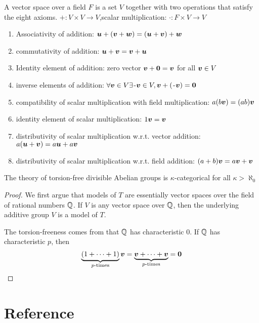 \documentclass[11pt]{article}
\begin{document}
\begin{definition}[]
A vector space over a field \(F\) is a set \(V\) together with two operations
that satisfy the eight axioms. \(+:V\times V\to V\),scalar multiplication:
\(\cdot:F\times V\to V\) 
\begin{enumerate}
\item Associativity of addition: \(\boldsymbol{u}+(\boldsymbol{v}+\boldsymbol{w})=(\boldsymbol{u}+\boldsymbol{v})+\boldsymbol{w}\)
\item commutativity of addition: \(\boldsymbol{u}+\boldsymbol{v}=\boldsymbol{v}+\boldsymbol{u}\)
\item Identity element of addition: zero vector \(\boldsymbol{v}+\boldsymbol{0}=\boldsymbol{v}\) for all \(\boldsymbol{v}\in
      V\)
\item inverse elements of addition: \(\forall \boldsymbol{v}\in V\exists\)-\(\boldsymbol{v}\in
      V,\boldsymbol{v}+(\)-\(\boldsymbol{v})=\boldsymbol{0}\)
\item compatibility of scalar multiplication with field multiplication:
\(a(b\boldsymbol{v})=(ab)\boldsymbol{v}\)
\item identity element of scalar multiplication: \(1\boldsymbol{v}=\boldsymbol{v}\)
\item distributivity of scalar multiplication w.r.t. vector addition:
\(a(\boldsymbol{u}+\boldsymbol{v})=a\boldsymbol{u}+a\boldsymbol{v}\)
\item distributivity of scalar multiplication w.r.t. field addition:
\((a+b)\boldsymbol{v}=a\boldsymbol{v}+\boldsymbol{v}\)
\end{enumerate}
\end{definition}


\begin{proposition}[]
The theory of torsion-free divisible Abelian groups is \(\kappa\)-categorical for
all \(\kappa>\aleph_0\)
\end{proposition}

\begin{proof}
We first argue that models of \(T\) are essentially vector spaces over the
field of rational numbers \(\mathbb{Q}\). If \(V\) is any vector space over \(\mathbb{Q}\), then
the underlying additive group \(V\) is a model of \(T\). 

The torsion-freeness
comes from that \(\mathbb{Q}\) has characteristic 0. If \(\mathbb{Q}\) has characteristic \(p\),
then
\begin{equation*}
\underbrace{(1+\dots+1)}_{p\text{-times}}\boldsymbol{v}=\underbrace{\boldsymbol{v}+\dots+\boldsymbol{v}}_{
p\text{-times}}=\boldsymbol{0}
\end{equation*}
\end{proof}

\section{Reference}
\label{sec:orge35b0ae}


\end{document}
